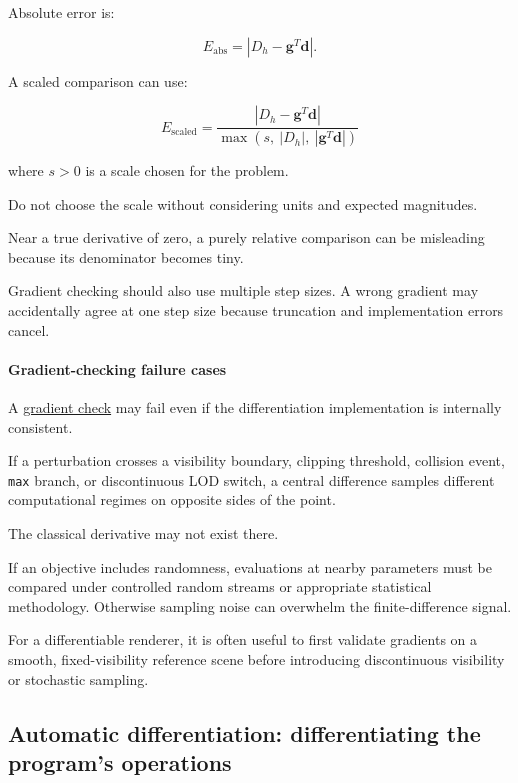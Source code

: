 \hypertarget{02-foundations-ii-ch022-how-should-disagreement-be-measured}{}

Absolute error is:

\[
E_{\mathrm{abs}}= |D_h-\mathbf g^T\mathbf d|.
\]

A scaled comparison can use:

\[
\boxed{ E_{\mathrm{scaled}} = \frac{ |D_h-\mathbf g^T\mathbf d| }{ \max(s,\ |D_h|,\ |\mathbf g^T\mathbf d|) } }
\]

where \(s>0\) is a scale chosen for the problem.

Do not choose the scale without considering units and expected magnitudes.

Near a true derivative of zero, a purely relative comparison can be misleading because its denominator becomes tiny.

Gradient checking should also use multiple step sizes. A wrong gradient may accidentally agree at one step size because truncation and implementation errors cancel.

\paragraph{Gradient-checking failure cases}\label{02-foundations-ii-ch022-gradient-checking-failure-cases}

\hypertarget{02-foundations-ii-ch022-gradient-checking-failure-cases}{}

A \hyperref[02-foundations-ii-ch022-numerical-differentiation-and-automatic-differentiation]{gradient check} may fail even if the differentiation implementation is internally consistent.

If a perturbation crosses a visibility boundary, clipping threshold, collision event, \texttt{max} branch, or discontinuous LOD switch, a central difference samples different computational regimes on opposite sides of the point.

The classical derivative may not exist there.

If an objective includes randomness, evaluations at nearby parameters must be compared under controlled random streams or appropriate statistical methodology. Otherwise sampling noise can overwhelm the finite-difference signal.

For a differentiable renderer, it is often useful to first validate gradients on a smooth, fixed-visibility reference scene before introducing discontinuous visibility or stochastic sampling.

\subsection{Automatic differentiation: differentiating the program's operations}\label{02-foundations-ii-ch022-automatic-differentiation-differentiating-the-programs-operations}

